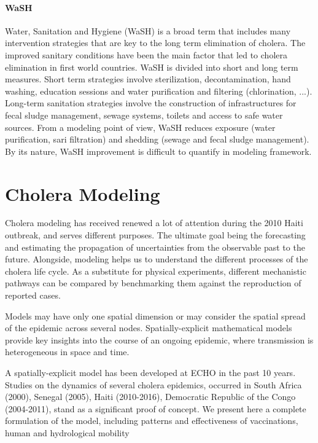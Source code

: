 \paragraph{WaSH} Water, Sanitation and Hygiene (WaSH) is a broad term that includes many intervention strategies that are key to the long term elimination of cholera. The improved sanitary conditions have been the main factor that led to cholera elimination  in first world countries. WaSH is divided into short and long term measures. Short term strategies involve sterilization, decontamination, hand washing, education sessions and water purification and filtering (chlorination, ...)\cite{Rebaudet:NationalAlertresponseStrategy:2018,Fewtrell:WaterSanitationHygiene:2005}. Long-term sanitation strategies involve the construction of infrastructures for fecal sludge management, sewage systems, toilets and access to safe water sources. From a modeling point of view, WaSH reduces exposure (water purification, sari filtration) and shedding (sewage and fecal sludge management). By its nature, WaSH improvement is difficult to quantify in modeling framework.

\section{Cholera Modeling}
Cholera modeling has received renewed a lot of attention during the 2010 Haiti outbreak, and serves different purposes. The ultimate goal being  the forecasting and estimating the propagation of uncertainties from the observable past to the future. Alongside, modeling helps us to understand the different processes of the cholera life cycle. As a substitute for physical experiments, different mechanistic pathways can be compared by benchmarking them against the reproduction of reported cases. 

Models may have only one spatial dimension or may consider the spatial spread of the epidemic across several nodes. Spatially-explicit mathematical models provide key insights into the course of an ongoing epidemic, where transmission is heterogeneous in space and time.

A spatially-explicit model has been developed at ECHO in the past 10 years\parencite{Bertuzzo:SpacetimeEvolutionCholera:2008}. Studies on the dynamics of several cholera epidemics, occurred in South Africa (2000)\parencite{Mari:ModellingCholeraEpidemics:2012}, Senegal (2005), Haiti (2010-2016)\parencite{Bertuzzo:PredictionSpatialEvolution:2011}, Democratic Republic of the Congo  (2004-2011), stand as a significant proof of concept.  
We present here a complete formulation of the model, including patterns and effectiveness of vaccinations, human and hydrological mobility\cite{Bertuzzo:ProbabilityExtinctionHaiti:2016,Pasetto:RealtimeProjectionsCholera:2017}



